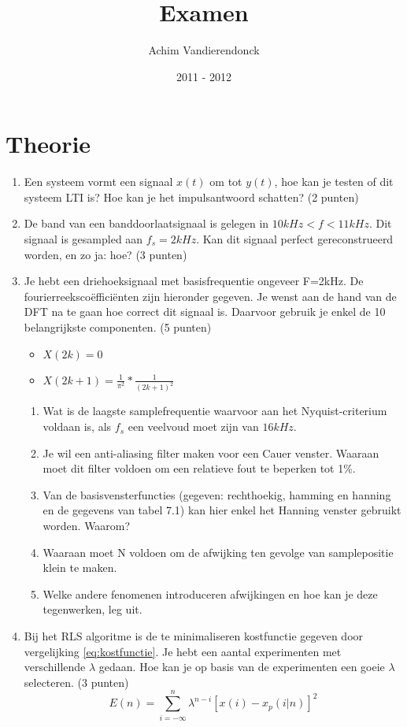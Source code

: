 \documentclass[a4paper]{article}
\title{Examen}
\author{Achim Vandierendonck}
\date{2011 - 2012}
\begin{document}
\maketitle

\section{Theorie}
\begin{enumerate}
	\item Een systeem vormt een signaal $x(t)$ om tot $y(t)$, hoe kan je testen of dit systeem LTI is? Hoe kan je het impulsantwoord schatten? (2 punten)
	\item De band van een banddoorlaatsignaal is gelegen in $10kHz<f<11kHz$. Dit signaal is gesampled aan $f_s = 2kHz$. Kan dit signaal perfect gereconstrueerd worden, en zo ja: hoe? (3 punten)
	\item Je hebt een driehoeksignaal met basisfrequentie ongeveer F=2kHz. De fourierreekscoëfficiënten zijn hieronder gegeven. Je wenst aan de hand van de DFT na te gaan hoe correct dit signaal is. Daarvoor gebruik je enkel de 10 belangrijkste componenten. (5 punten)
	\begin{itemize}
		\item $X(2k) = 0$
		\item $X(2k+1) = \frac{1}{\pi^2} * \frac{1}{(2k+1)^2}$
	\end{itemize}
	\begin{enumerate}
		\item Wat is de laagste samplefrequentie waarvoor aan het Nyquist-criterium voldaan is, als $f_s$ een veelvoud moet zijn van $16kHz$.
		\item Je wil een anti-aliasing filter maken voor een Cauer venster. Waaraan moet dit filter voldoen om een relatieve fout te beperken tot 1\%.
		\item Van de basisvensterfuncties (gegeven: rechthoekig, hamming en hanning en de gegevens van tabel 7.1) kan hier enkel het Hanning venster gebruikt worden. Waarom?
		\item Waaraan moet N voldoen om de afwijking ten gevolge van samplepositie klein te maken.
		\item Welke andere fenomenen introduceren afwijkingen en hoe kan je deze tegenwerken, leg uit.
	\end{enumerate}
	\item Bij het RLS algoritme is de te minimaliseren kostfunctie gegeven door vergelijking \ref{eq:kostfunctie}. Je hebt een aantal experimenten met verschillende $\lambda$ gedaan. Hoe kan je op basis van de experimenten een goeie $\lambda$ selecteren. (3 punten)
	\begin{equation}
		E(n) = \sum_{i=-\infty}^n{\lambda^{n-i}[x(i)-x_p(i|n)]^2}
		\label{eq:kostfunctie}
	\end{equation}
\end{enumerate}
\end{document}
